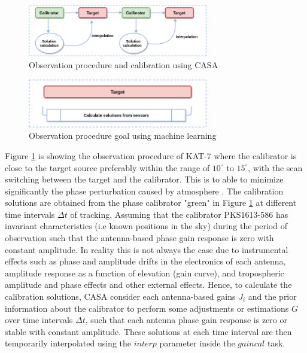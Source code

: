 \begin{figure}[H]
  \centering
    \includegraphics[width=0.7\textwidth]{images/cal4.png}
    \caption{Observation procedure and calibration using CASA}
  \label{Cal2}
\end{figure}

\begin{figure}[H]
  \centering
    \includegraphics[width=0.7\textwidth]{images/Cal3.png}
    \caption{Observation procedure goal using machine learning}
  \label{Cal3}
\end{figure}

Figure \ref{Cal2} is showing the observation procedure of KAT-7 where the calibrator is close to the target source preferably within the range of $10^{\circ}$ to $15^{\circ}$, with the scan switching  between  the target and the calibrator. This is to able to minimize significantly the phase perturbation caused by atmosphere \citep{kassaye2015study}. The calibration solutions are obtained from the phase calibrator "green" in Figure \ref{Cal2} at different time intervals $\Delta t$ of tracking, Assuming that the calibrator PKS1613-586 has invariant characteristics (i.e known positions in the sky) during the period of observation such that the 
antenna-based  phase  gain response is zero with constant amplitude. In reality this is not always the case due to instrumental effects such as phase and amplitude drifts in the electronics of each antenna, amplitude response as a function of elevation (gain curve), and tropospheric amplitude and phase effects and other external effects. Hence, to calculate the calibration solutions, CASA consider each antenna-based gains $J_i$ and the prior information about the calibrator to perform some adjustments or estimations $G$ over time intervals $\Delta t$, such that each antenna phase gain response is zero or stable with constant amplitude. These solutions at each time interval are then temporarily interpolated using the $\textit{interp}$ parameter inside the $\textit{gaincal}$ task. 

